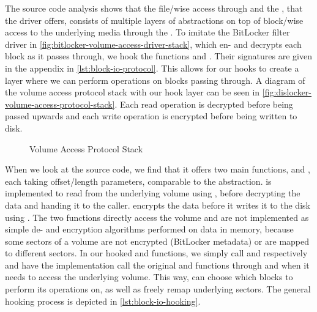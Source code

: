 The source code analysis shows that the file\-/wise access through  and the , that the driver offers, consists of multiple layers of abstractions on top of block\-/wise access to the underlying media through the .
To imitate the BitLocker filter driver in \autoref{fig:bitlocker-volume-access-driver-stack}, which en- and decrypts each block as it passes through, we hook the  functions  and . Their signatures are given in the appendix in \autoref{lst:block-io-protocol}.
This allows for our hooks to create a layer where we can perform  operations on blocks passing through.
A diagram of the volume access protocol stack with our  hook layer can be seen in \autoref{fig:dislocker-volume-access-protocol-stack}.
Each read operation is decrypted before being passed upwards and each write operation is encrypted before being written to disk.

\begin{figure}[htb]%
    \centering
    
    \caption{ Volume Access Protocol Stack}%
    \label{fig:dislocker-volume-access-protocol-stack}%
\end{figure}

When we look at the  source code, we find that it offers two main functions,  and , each taking offset\-/length parameters, comparable to the  abstraction.
 is implemented to read from the underlying volume using , before decrypting the data and handing it to the caller.
 encrypts the data before it writes it to the disk using .
The two functions directly access the volume and are not implemented as simple de- and encryption algorithms performed on data in memory, because some sectors of a volume are not encrypted (BitLocker metadata) or are mapped to different sectors.
In our hooked  and  functions, we simply call  and  respectively and have the  implementation call the original  and  functions through  and  when it needs to access the underlying volume.
This way,  can choose which blocks to perform its operations on, as well as freely remap underlying sectors.
The general hooking process is depicted in \autoref{lst:block-io-hooking}.

